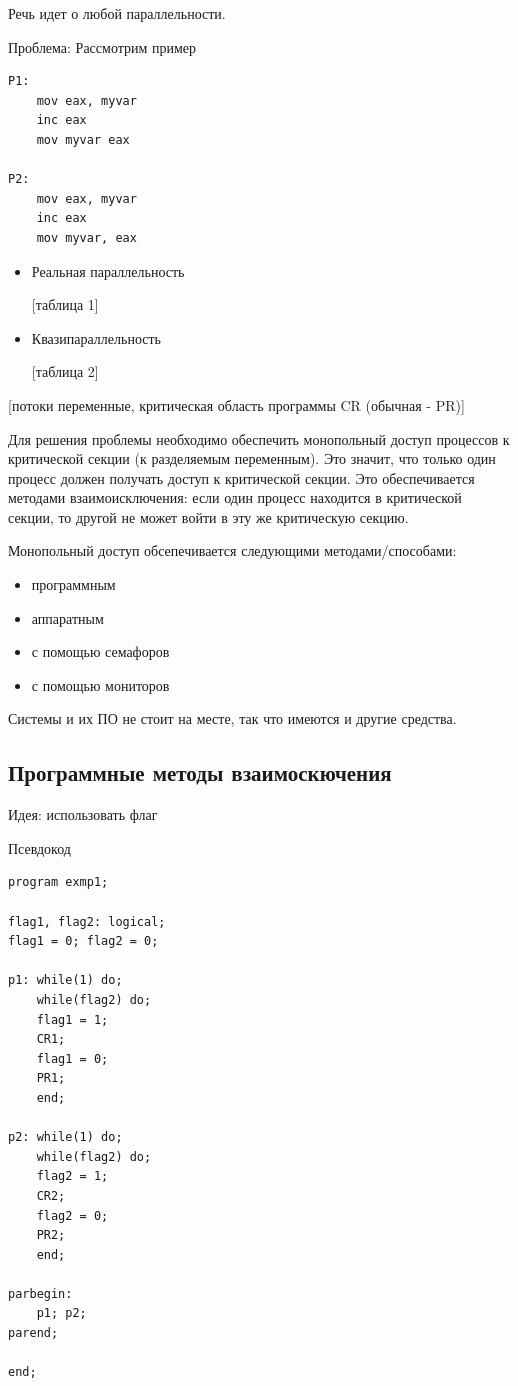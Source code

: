 \documentclass[14pt, a4paper]{article}
\begin{document}
	Речь идет о любой параллельности.
	
	Проблема: Рассмотрим пример
	
	\begin{lstlisting}
P1:
	mov eax, myvar
	inc eax
	mov myvar eax

P2:
	mov eax, myvar
	inc eax
	mov myvar, eax
	\end{lstlisting}

	\begin{itemize}
		\item Реальная параллельность
		
		[таблица 1]
		
		\item Квазипараллельность
		
		[таблица 2]
	\end{itemize}

	[потоки переменные, критическая область программы CR (обычная - PR)]
	
	Для решения проблемы необходимо обеспечить монопольный доступ процессов к критической секции (к разделяемым переменным). Это значит, что только один процесс должен получать доступ к критической секции. Это обеспечивается методами взаимоисключения: если один процесс находится в критической секции, то другой не может войти в эту же критическую секцию.
	
	Монопольный доступ обсепечивается следующими методами/способами:
	
	\begin{itemize}
		\item программным
		\item аппаратным
		\item с помощью семафоров
		\item с помощью мониторов
	\end{itemize}

	Системы и их ПО не стоит на месте, так что имеются и другие средства.
	
	\subsection*{Программные методы взаимоскючения}
	
	Идея: использовать флаг
	
	Псевдокод
	
	\begin{lstlisting}
program exmp1;

flag1, flag2: logical;
flag1 = 0; flag2 = 0;

p1: while(1) do;
	while(flag2) do;
	flag1 = 1;
	CR1;
	flag1 = 0;
	PR1;
	end;

p2: while(1) do;
	while(flag2) do;
	flag2 = 1;
	CR2;
	flag2 = 0;
	PR2;
	end;

parbegin:
	p1; p2;
parend;

end;
	\end{lstlisting}
\end{document}
